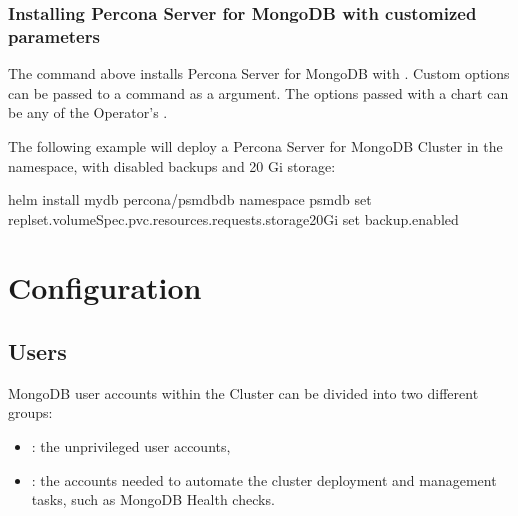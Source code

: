 \documentclass[letterpaper,10pt,english]{sphinxmanual}
\begin{document}
\section{Installing Percona Server for MongoDB with customized parameters}
\label{\detokenize{helm:installing-percona-server-for-mongodb-with-customized-parameters}}
The command above installs Percona Server for MongoDB with {\hyperref[\detokenize{operator:operator-custom-resource-options}]{}}.
Custom options can be passed to a  command as a
 argument. The options passed with a chart can be
any of the Operator’s {\hyperref[\detokenize{operator:operator-custom-resource-options}]{}}.

The following example will deploy a Percona Server for MongoDB Cluster in the
 namespace, with disabled backups and 20 Gi storage:

\begin{sphinxVerbatim}[commandchars=\\\{\}]
helm install my\PYGZhy{}db percona/psmdb\PYGZhy{}db \PYGZhy{}\PYGZhy{}namespace psmdb 
  \PYGZhy{}\PYGZhy{}set replset.volumeSpec.pvc.resources.requests.storage20Gi 
  \PYGZhy{}\PYGZhy{}set backup.enabled
\end{sphinxVerbatim}


\part{Configuration}
\label{\detokenize{index:configuration}}

\chapter{Users}
\label{\detokenize{users:users}}\label{\detokenize{users:id1}}\label{\detokenize{users::doc}}
MongoDB user accounts within the Cluster can be divided into two different groups:
\begin{itemize}
\item {} 
: the unprivileged user accounts,

\item {} 
: the accounts needed to automate the cluster deployment
and management tasks, such as MongoDB Health checks.

\end{itemize}
\end{document}
